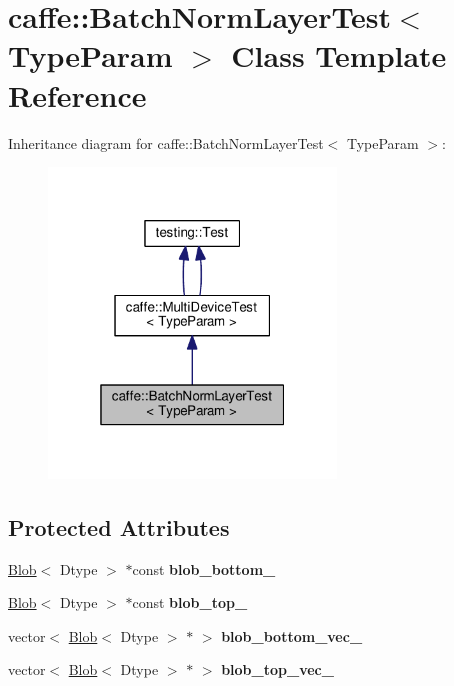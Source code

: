 \hypertarget{classcaffe_1_1_batch_norm_layer_test}{}\section{caffe\+:\+:Batch\+Norm\+Layer\+Test$<$ Type\+Param $>$ Class Template Reference}
\label{classcaffe_1_1_batch_norm_layer_test}


Inheritance diagram for caffe\+:\+:Batch\+Norm\+Layer\+Test$<$ Type\+Param $>$\+:
\nopagebreak
\begin{figure}[H]
\begin{center}
\leavevmode
\includegraphics[width=217pt]{classcaffe_1_1_batch_norm_layer_test__inherit__graph}
\end{center}
\end{figure}
\subsection*{Protected Attributes}
\begin{DoxyCompactItemize}
\item 
\mbox{\label{classcaffe_1_1_batch_norm_layer_test_ac224c1fe4dd3b7526f1ecc7fa6b4ed05}} 
\mbox{\hyperlink{classcaffe_1_1_blob}{Blob}}$<$ Dtype $>$ $\ast$const {\bfseries blob\+\_\+bottom\+\_\+}
\item 
\mbox{\label{classcaffe_1_1_batch_norm_layer_test_a38f55869eefaa95edba3f9633c9088de}} 
\mbox{\hyperlink{classcaffe_1_1_blob}{Blob}}$<$ Dtype $>$ $\ast$const {\bfseries blob\+\_\+top\+\_\+}
\item 
\mbox{\label{classcaffe_1_1_batch_norm_layer_test_ab9bf9b9a7615876e837a8cc1e5b34eeb}} 
vector$<$ \mbox{\hyperlink{classcaffe_1_1_blob}{Blob}}$<$ Dtype $>$ $\ast$ $>$ {\bfseries blob\+\_\+bottom\+\_\+vec\+\_\+}
\item 
\mbox{\label{classcaffe_1_1_batch_norm_layer_test_ae2c63b1c735083b345c1e4bffc0925ba}} 
vector$<$ \mbox{\hyperlink{classcaffe_1_1_blob}{Blob}}$<$ Dtype $>$ $\ast$ $>$ {\bfseries blob\+\_\+top\+\_\+vec\+\_\+}
\end{DoxyCompactItemize}
